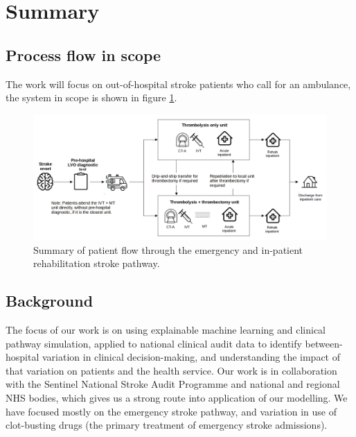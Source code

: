 \section*{Summary}

\subsection*{Process flow in scope}

The work will focus on out-of-hospital stroke patients who call for an ambulance, the system in scope is shown in figure \ref{fig:flow}.

\begin{figure}[h!]
\centering
\includegraphics[width=1.0\textwidth]{./images/pathway}
\caption{Summary of patient flow through the emergency and in-patient rehabilitation stroke pathway.}
\label{fig:flow}
\end{figure}

\subsection*{Background}

The focus of our work is on using explainable machine learning and clinical pathway simulation, applied to national clinical audit data to identify between-hospital variation in clinical decision-making, and understanding the impact of that variation on patients and the health service. Our work is in collaboration with the Sentinel National Stroke Audit Programme and national and regional NHS bodies, which gives us a strong route into application of our modelling. We have focused mostly on the emergency stroke pathway, and variation in use of clot-busting drugs (the primary treatment of emergency stroke admissions).


